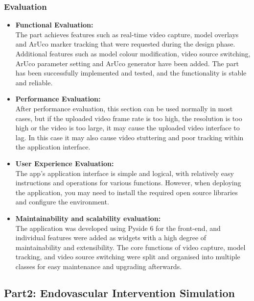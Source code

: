 \documentclass[12pt]{article}
\begin{document}
\subsubsection{Evaluation}
\begin{itemize}
      \item \textbf{Functional Evaluation:}
      \\
      The part achieves features such as real-time video capture, model overlays and ArUco marker tracking that were requested during the design phase. Additional features such as model colour modification, video source switching, ArUco parameter setting and ArUco generator have been added. The part has been successfully implemented and tested, and the functionality is stable and reliable.
      \item \textbf{Performance Evaluation:}
      \\
      After performance evaluation, this section can be used normally in most cases, but if the uploaded video frame rate is too high, the resolution is too high or the video is too large, it may cause the uploaded video interface to lag. In this case it may also cause video stuttering and poor tracking within the application interface.
      \item \textbf{User Experience Evaluation:}
      \\
      The app's application interface is simple and logical, with relatively easy instructions and operations for various functions. However, when deploying the application, you may need to install the required open source libraries and configure the environment.
      \item \textbf{Maintainability and scalability evaluation:}
      \\
      The application was developed using Pyside 6 for the front-end, and individual features were added as widgets with a high degree of maintainability and extensibility. The core functions of video capture, model tracking, and video source switching were split and organised into multiple classes for easy maintenance and upgrading afterwards.
      \end{itemize}
\subsection{Part2: Endovascular Intervention Simulation}
\end{document}
